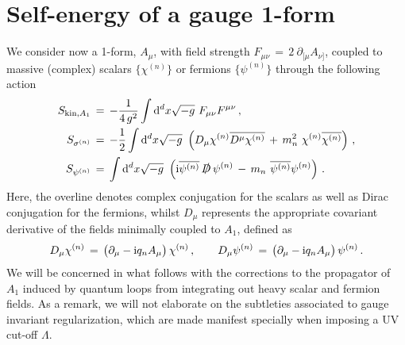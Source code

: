\section{Self-energy of a gauge 1-form}
\label{ap:Loops1-form}
		
We consider now a 1-form, $A_\mu$, with field strength $F_{\mu \nu }\, =\,2\  \partial_{[\mu} A_{\nu]}$, coupled to massive (complex) scalars $\{\chi^{(n)}\}$ or fermions $\{\psi^{(n)}\}$ through the following action
%
\begin{align}
			S_{\mathrm{kin,} A_1}\, &= \, -\dfrac{1}{4\, g^2} \int {\rm d}^d x \sqrt{-g} \   F_{\mu\nu} F^{\mu \nu}\, , \label{eq:SkinA1} \\
			S_{\sigma^{(n)}} \, &=\,  - \dfrac{1}{2} \int {\rm d}^d x \sqrt{-g} \ \left(  D_\mu \chi^{(n)} \overline{D^\mu \chi^{(n)}}\,  +\,  m_n^2 \ \chi^{(n)} \overline{\chi^{(n)}} \right) \, , \label{eq:SchinA1}\\
			S_{\psi^{(n)}} \, &= \,  \int {\rm d}^d x \sqrt{-g} \   \left( \text{i} \overline{\psi^{(n)}}\,  \slashed{D} \, \psi^{(n)} \, -\,  m_n \ \overline{\psi^{(n)}}\psi^{(n)} \right) \, . \label{eq:SpsinA1}
\end{align}
%
Here, the overline denotes complex conjugation for the scalars as well as Dirac conjugation for the fermions, whilst $D_\mu$ represents the appropriate covariant derivative of the fields minimally coupled to $A_1$, defined as 
%
\begin{equation}
			D_\mu \chi^{(n)} \, = \, \left(\partial_\mu -\text{i} q_n A_\mu \right) \chi^{(n)} \, , \qquad D_\mu \psi^{(n)} \, = \, \left(\partial_\mu -\text{i} q_n A_\mu \right) \psi^{(n)}\, .
\end{equation}
%
We will be concerned in what follows with the corrections to the propagator of $A_1$ induced by quantum loops from integrating out heavy scalar and fermion fields. As a remark, we will not elaborate on the subtleties associated to gauge invariant regularization, which are made manifest specially when imposing a UV cut-off $\Lambda$. %
